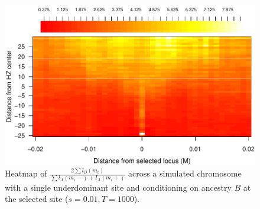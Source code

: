 \begin{figure}
\includegraphics{figs/ratioAdjacentBlocksAlongChromHeatmapAncBConditioning.pdf}
\caption{Heatmap of $\frac{2\sum{l_B(m_i)}}{\sum{l_A(m_i-)+I_A(m_i+)}}$ across a simulated chromosome with a single underdominant site and conditioning on ancestry $B$ at the selected site ($s=0.01, T=1000$). }\label{Supp:ratioBlockAdjacentHeatmap}
\end{figure}



